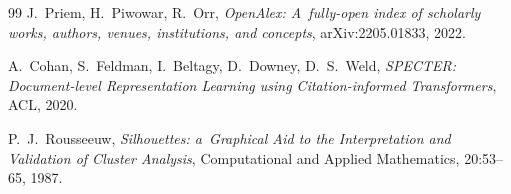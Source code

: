 \documentclass[a4paper,11pt,twocolumn]{article}
\begin{document}
\begin{thebibliography}{99}
J.~Priem, H.~Piwowar, R.~Orr,
\emph{OpenAlex: A~fully-open index of scholarly works, authors,
venues, institutions, and concepts},
arXiv:2205.01833, 2022.

A.~Cohan, S.~Feldman, I.~Beltagy, D.~Downey, D.~S.~Weld,
\emph{SPECTER: Document-level Representation Learning using
Citation-informed Transformers},
ACL, 2020.

P.~J.~Rousseeuw,
\emph{Silhouettes: a~Graphical Aid to the Interpretation
and Validation of Cluster Analysis},
Computational and Applied Mathematics, 20:53--65, 1987.

\end{thebibliography}
\end{document}
